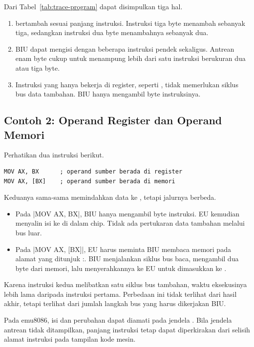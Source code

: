 Dari Tabel~\ref{tab:trace-program} dapat disimpulkan tiga hal.

\begin{enumerate}
    \item {} bertambah sesuai panjang instruksi. Instruksi tiga
          byte menambah  sebanyak tiga, sedangkan instruksi
          dua byte menambahnya sebanyak dua.
    \item BIU dapat mengisi  dengan beberapa instruksi
          pendek sekaligus. Antrean enam byte cukup untuk menampung
          lebih dari satu instruksi berukuran dua atau tiga byte.
    \item Instruksi yang hanya bekerja di register, seperti
          , tidak memerlukan siklus bus data
          tambahan. BIU hanya mengambil byte instruksinya.
\end{enumerate}

\subsection{Contoh 2: Operand Register dan Operand Memori}

Perhatikan dua instruksi berikut.

\begin{lstlisting}[language=MASM, numbers=none]
MOV AX, BX      ; operand sumber berada di register
MOV AX, [BX]    ; operand sumber berada di memori
\end{lstlisting}

Keduanya sama-sama memindahkan data ke , tetapi jalurnya
berbeda.

\begin{itemize}
    \item Pada \lstasm|MOV AX, BX|, BIU hanya mengambil byte
          instruksi. EU kemudian menyalin isi  ke 
          di dalam chip. Tidak ada pertukaran data tambahan melalui
          bus luar.
    \item Pada \lstasm|MOV AX, [BX]|, EU harus meminta BIU membaca
          memori pada alamat yang ditunjuk :.
          BIU menjalankan siklus bus baca, mengambil dua byte dari
          memori, lalu menyerahkannya ke EU untuk dimasukkan ke
          .
\end{itemize}

Karena instruksi kedua melibatkan satu siklus bus tambahan, waktu
eksekusinya lebih lama daripada instruksi pertama. Perbedaan ini
tidak terlihat dari hasil akhir, tetapi terlihat dari jumlah langkah
bus yang harus dikerjakan BIU.

\begin{infobox}
\vspace{1.1em}
Pada emu8086, isi  dan perubahan  dapat diamati
pada jendela . Bila jendela antrean tidak ditampilkan,
panjang instruksi tetap dapat diperkirakan dari selisih alamat
instruksi pada tampilan kode mesin.
\end{infobox}
